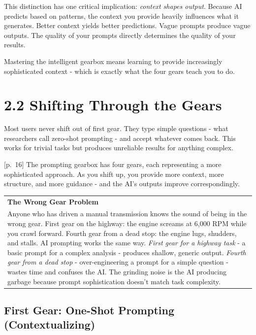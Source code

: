 \documentclass[
  letterpaper,
  DIV=11,
  numbers=noendperiod]{scrreprt}
\newcounter{none} %
\begin{document}
This distinction has one critical implication: \emph{context shapes
output}. Because AI predicts based on patterns, the context you provide
heavily influences what it generates. Better context yields better
predictions. Vague prompts produce vague outputs. The quality of your
prompts directly determines the quality of your results.

Mastering the intelligent gearbox means learning to provide increasingly
sophisticated context - which is exactly what the four gears teach you
to do.

\section{2.2 Shifting Through the
Gears}\label{shifting-through-the-gears}

Most users never shift out of first gear. They type simple questions -
what researchers call zero-shot prompting - and accept whatever comes
back. This works for trivial tasks but produces unreliable results for
anything complex.

{[}p.~16{]} The prompting gearbox has four gears, each representing a
more sophisticated approach. As you shift up, you provide more context,
more structure, and more guidance - and the AI's outputs improve
correspondingly.

{\def\LTcaptype{none} %
\begin{longtable}[]{@{}
  >{\raggedright\arraybackslash}p{}@{}}
\toprule\noalign{}
\endhead
\bottomrule\noalign{}
\endlastfoot
\textbf{The Wrong Gear Problem} \\
Anyone who has driven a manual transmission knows the sound of being in
the wrong gear. First gear on the highway: the engine screams at 6,000
RPM while you crawl forward. Fourth gear from a dead stop: the engine
lugs, shudders, and stalls. AI prompting works the same way. \emph{First
gear for a highway task} - a basic prompt for a complex analysis -
produces shallow, generic output. \emph{Fourth gear from a dead stop} -
over-engineering a prompt for a simple question - wastes time and
confuses the AI. The grinding noise is the AI producing garbage because
prompt sophistication doesn't match task complexity. \\
\end{longtable}
}

\subsection{First Gear: One-Shot Prompting
(Contextualizing)}\label{first-gear-one-shot-prompting-contextualizing}
\end{document}
